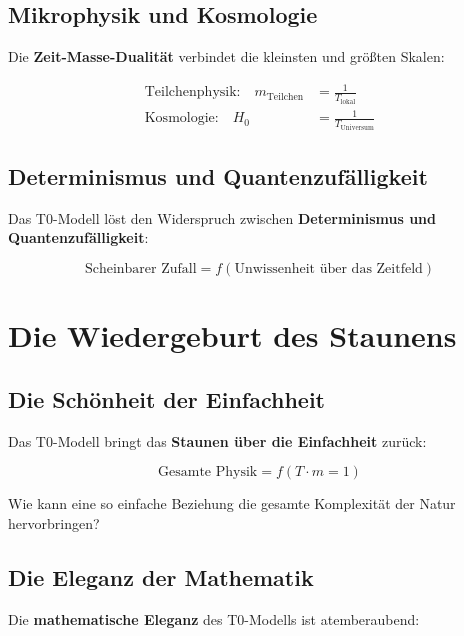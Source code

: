 \documentclass[12pt,a4paper]{report}
\begin{document}
	\subsection{Mikrophysik und Kosmologie}
	
	Die \textbf{Zeit-Masse-Dualität} verbindet die kleinsten und größten Skalen:
	
	\begin{align}
		\text{Teilchenphysik:} \quad m_{\text{Teilchen}} &= \frac{1}{T_{\text{lokal}}} \\
		\text{Kosmologie:} \quad H_0 &= \frac{1}{T_{\text{Universum}}}
	\end{align}
	
	\subsection{Determinismus und Quantenzufälligkeit}
	
	Das T0-Modell löst den Widerspruch zwischen \textbf{Determinismus und Quantenzufälligkeit}:
	
	\begin{equation}
		\text{Scheinbarer Zufall} = f(\text{Unwissenheit über das Zeitfeld})
	\end{equation}
	
	\section{Die Wiedergeburt des Staunens}
	
	\subsection{Die Schönheit der Einfachheit}
	
	Das T0-Modell bringt das \textbf{Staunen über die Einfachheit} zurück:
	
	\begin{equation}
		\text{Gesamte Physik} = f(T \cdot m = 1)
	\end{equation}
	
	Wie kann eine so einfache Beziehung die gesamte Komplexität der Natur hervorbringen?
	
	\subsection{Die Eleganz der Mathematik}
	
	Die \textbf{mathematische Eleganz} des T0-Modells ist atemberaubend:
	
\end{document}
